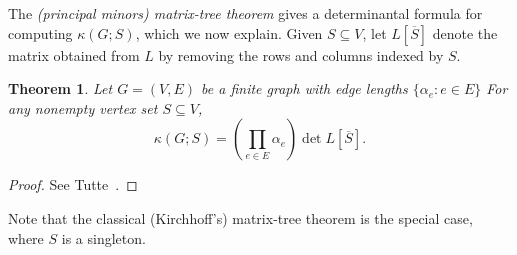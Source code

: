 \documentclass[12pt]{amsart}
\newtheorem{thm}{Theorem}[section]
\theoremstyle{definition}
\newcommand{\La}{L}
\newcommand{\trees}{\mathcal{F}_1}
\newcommand\farbod[1]{\footnote{[\textcolor{orange}{(Farbod)} \textcolor{blue}{#1}]}}
\begin{document}



The {\em (principal minors) matrix-tree theorem} gives a determinantal formula for computing $\kappa(G;S)$, which we now explain. 
Given $S \subseteq V$, let $L[\overline S]$ denote the matrix obtained from $L$ by removing the rows and columns indexed by $S$.


\begin{thm}
\label{thm:matrix-tree}
Let $G = (V,E)$ be a finite graph with edge lengths $\{ \alpha_e \colon e \in E\}$
%
For any nonempty vertex set $S \subseteq V$,
\begin{equation}
	\kappa( G ; S) = \left(\prod_{e \in E} \alpha_e \right) \det L[\overline S] .
\end{equation}
\end{thm}
\begin{proof}
See Tutte~\cite[Section VI.6, Equation (VI.6.7)]{tutte}.
\end{proof}
Note that the classical (Kirchhoff's) matrix-tree theorem is the special case, where $S$ is a singleton.
\end{document}
